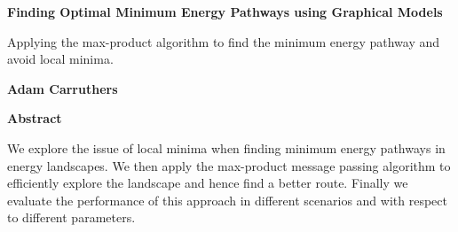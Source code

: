 
\begin{titlepage}
    \thispagestyle{plain}
    \begin{center}
        \vspace*{1.4cm}
        \Large
        \textbf{Finding Optimal Minimum Energy Pathways using Graphical Models}

        \vspace{1cm}
        \large
        Applying the max-product algorithm to find the minimum energy pathway and avoid local minima.

        \vspace{0.4cm}
        \textbf{Adam Carruthers}

        \vspace{1.2cm}
        \textbf{Abstract}
    \end{center}
    We explore the issue of local minima when finding minimum energy pathways in energy landscapes.
    We then apply the max-product message passing algorithm to efficiently explore the landscape and hence find a better route.
    Finally we evaluate the performance of this approach in different scenarios and with respect to different parameters.
\end{titlepage}